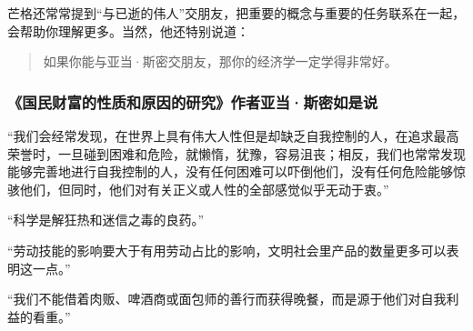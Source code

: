 芒格还常常提到“与已逝的伟人”交朋友，把重要的概念与重要的任务联系在一起，会帮助你理解更多。当然，他还特别说道：
\par

\begin{quotation}
如果你能与亚当·斯密交朋友，那你的经济学一定学得非常好。
\par
\end{quotation}

\subsubsection*{《国民财富的性质和原因的研究》作者亚当·斯密如是说}

“我们会经常发现，在世界上具有伟大人性但是却缺乏自我控制的人，在追求最高荣誉时，一旦碰到困难和危险，就懒惰，犹豫，容易沮丧；相反，我们也常常发现能够完善地进行自我控制的人，没有任何困难可以吓倒他们，没有任何危险能够惊骇他们，但同时，他们对有关正义或人性的全部感觉似乎无动于衷。”
\par

“科学是解狂热和迷信之毒的良药。”
\par

“劳动技能的影响要大于有用劳动占比的影响，文明社会里产品的数量更多可以表明这一点。”
\par

“我们不能借着肉贩、啤酒商或面包师的善行而获得晚餐，而是源于他们对自我利益的看重。”
\par
